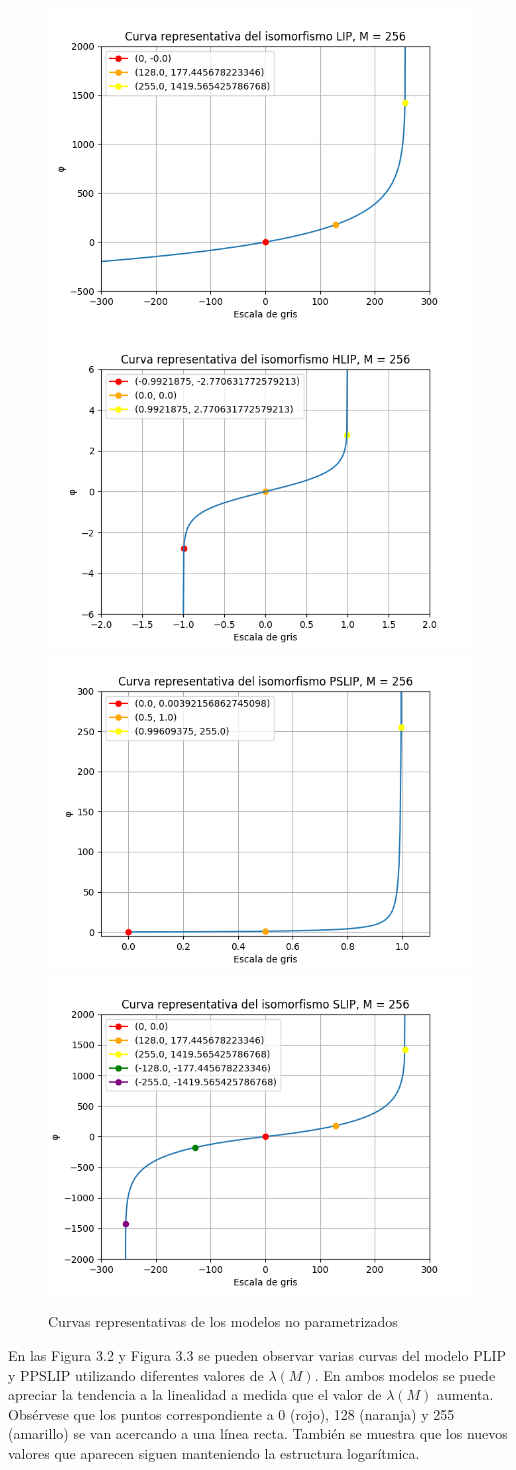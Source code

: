 \begin{figure}
	\begin{center}
		\includegraphics[width=5.5 cm]{images/clasics_curves/lip_curve.png}
		\includegraphics[width=5.5 cm]{images/clasics_curves/hlip_curve.png}
		\includegraphics[width=5.5 cm]{images/clasics_curves/pslip_curve.png}
		\includegraphics[width=5.5 cm]{images/clasics_curves/slip_curve.png}
		\caption{Curvas representativas de los modelos no parametrizados}
	\end{center}
\end{figure}

En las Figura 3.2 y Figura 3.3 se pueden observar varias curvas del modelo PLIP y PPSLIP utilizando diferentes valores de $\lambda(M)$. En ambos modelos se puede apreciar la tendencia a la linealidad a medida que el valor de $\lambda(M)$ aumenta. Obs\'ervese que los puntos correspondiente a 0 (rojo), 128 (naranja) y 255 (amarillo) se van acercando a una l\'inea recta. Tambi\'en se muestra que los nuevos valores que aparecen siguen manteniendo la estructura logar\'itmica.

